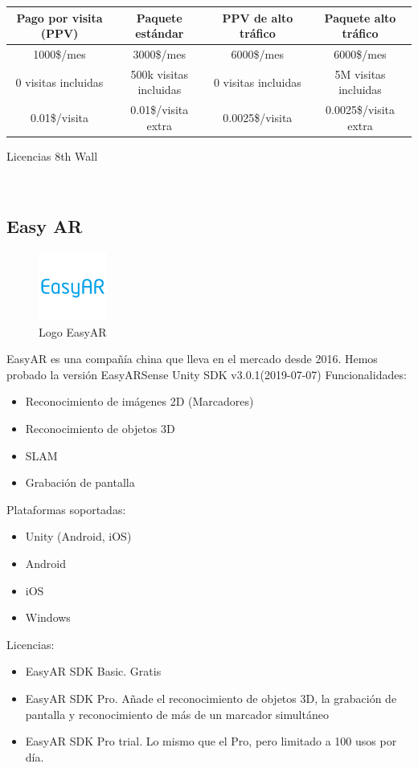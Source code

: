 \begin{center}
\begin{tabular}{| c| c |c| c |}
 Pago por visita (PPV)&	Paquete estándar&PPV de alto tráfico&Paquete alto tráfico \\
 \hline
  1000\$/mes	& 3000\$/mes	& 6000\$/mes &	6000\$/mes \\  
  \hline
 0 visitas incluidas &	500k visitas incluidas&	0 visitas incluidas	&5M visitas incluidas\\
 \hline
 0.01\$/visita&	0.01\$/visita extra&	0.0025\$/visita&	0.0025\$/visita extra\\
 \hline
\end{tabular}
\caption{Licencias 8th Wall}
\end{center}
\\

\subsection{Easy AR}
\begin{figure}[H]
    \centering
    \includegraphics[width=0.2\textwidth]{Images/EasyAR.png}
    \caption{Logo EasyAR}
    \label{fig:my_label}
\end{figure}

EasyAR es una compañía china que lleva en el mercado desde 2016. Hemos probado la versión EasyARSense Unity SDK v3.0.1(2019-07-07)\cite{EasyAR}
Funcionalidades:
\begin{itemize}
\item Reconocimiento de imágenes 2D (Marcadores)
\item Reconocimiento de objetos 3D
\item SLAM
\item Grabación de pantalla
\end{itemize}
Plataformas soportadas:
\begin{itemize}
\item Unity (Android, iOS)
\item Android
\item iOS
\item Windows
\end{itemize}
Licencias:
\begin{itemize}
\item EasyAR SDK Basic. Gratis
\item EasyAR SDK Pro. Añade el reconocimiento de objetos 3D, la grabación de pantalla y reconocimiento de más de un marcador simultáneo
\item EasyAR SDK Pro trial. Lo mismo que el Pro, pero limitado a 100 usos por día.
\end{itemize}


